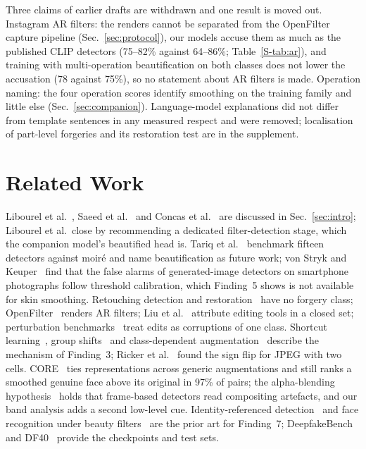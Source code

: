 \documentclass[conference]{IEEEtran}
\begin{document}
Three claims of earlier drafts are withdrawn and one result is moved out. Instagram AR filters: the renders cannot be separated from the OpenFilter
capture pipeline (Sec.~\ref{sec:protocol}), our models accuse them as much as the published CLIP detectors (75--82\% against
64--86\%; Table~\ref{S-tab:ar}),
and training with multi-operation beautification on both classes does not lower the accusation (78 against 75\%), so no
statement about AR filters is made.
Operation naming: the four operation scores identify smoothing on the training family and little else
(Sec.~\ref{sec:companion}). Language-model explanations did not differ from template sentences in any measured respect and
were removed; localisation of part-level forgeries and its restoration test are in the supplement.

\section{Related Work}
\label{sec:related}
Libourel et al.~\cite{libourel2024}, Saeed et al.~\cite{saeed2025} and Concas et al.~\cite{concas2025} are discussed in
Sec.~\ref{sec:intro}; Libourel et al.\ close by recommending a dedicated filter-detection stage, which the companion model's
beautified head is. Tariq et al.~\cite{moire2025} benchmark fifteen detectors against moir\'e and name beautification as
future work; von Stryk and Keuper~\cite{laionmobile2026} find that the false alarms of generated-image detectors on smartphone
photographs follow threshold calibration, which Finding~5 shows is not available for skin smoothing. Retouching detection and
restoration~\cite{bharati2016,jain2018,wang2019photoshop,retouchingffhq,frrffusion,mofrr,reface} have no forgery class;
OpenFilter~\cite{openfilter2022} renders AR filters; Liu et al.~\cite{miea2026} attribute editing tools in a closed set;
perturbation benchmarks~\cite{deeperforensics2020,hendrycks2019} treat edits as corruptions of one class. Shortcut
learning~\cite{geirhos2020}, group shifts~\cite{sagawa2020} and class-dependent augmentation~\cite{balestriero2022} describe
the mechanism of Finding~3; Ricker et al.~\cite{ricker2026biasid} found the sign flip for JPEG with two cells. CORE~\cite{core}
ties representations across generic augmentations and still ranks a smoothed genuine face above its original in 97\% of
pairs; the alpha-blending hypothesis~\cite{alphablend2026} holds that frame-based detectors read compositing artefacts, and our
band analysis adds a second low-level cue. Identity-referenced detection~\cite{idreveal2021,ict2022,yin2026} and face
recognition under beauty filters~\cite{mirabet2025} are the prior art for Finding~7; DeepfakeBench~\cite{deepfakebench} and
DF40~\cite{df40} provide the checkpoints and test sets.
\end{document}
